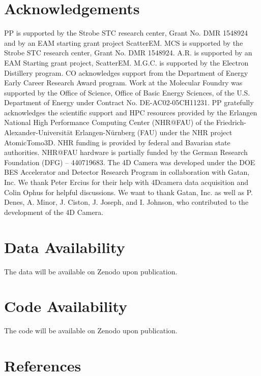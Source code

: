 \documentclass[12pt]{iopart}
\begin{document}
\section{Acknowledgements}
PP is supported by the Strobe STC research center, Grant No. DMR 1548924 and by an EAM starting grant project ScatterEM.
MCS is supported by the Strobe STC research center, Grant No. DMR 1548924.
A.R. is supported by an EAM Starting grant project, ScatterEM.
M.G.C. is supported by the Electron Distillery program. 
CO acknowledges support from the Department of Energy Early Career Research Award program. Work at the Molecular Foundry was supported by the Office of Science, Office of Basic Energy Sciences, of the U.S. Department of Energy under Contract No. DE-AC02-05CH11231. 
PP gratefully acknowledges the scientific support and HPC resources provided by the Erlangen National High Performance Computing Center (NHR@FAU) of the Friedrich-Alexander-Universität Erlangen-Nürnberg (FAU) under the NHR project AtomicTomo3D. NHR funding is provided by federal and Bavarian state authorities. NHR@FAU hardware is partially funded by the German Research Foundation (DFG) – 440719683.
The 4D Camera was developed under the DOE BES Accelerator and Detector Research Program in collaboration with Gatan, Inc. 
We thank Peter Ercius for their help with 4Dcamera data acquisition and Colin Ophus for helpful discussions.
We want to thank Gatan, Inc. as well as P. Denes, A. Minor, J. Ciston, J. Joseph, and I. Johnson, who contributed to the development of the 4D Camera.
\section{Data Availability}
The data will be available on Zenodo upon publication.
\section{Code Availability}
The code will be available on Zenodo upon publication.
\section{References}


% 
\end{document}
